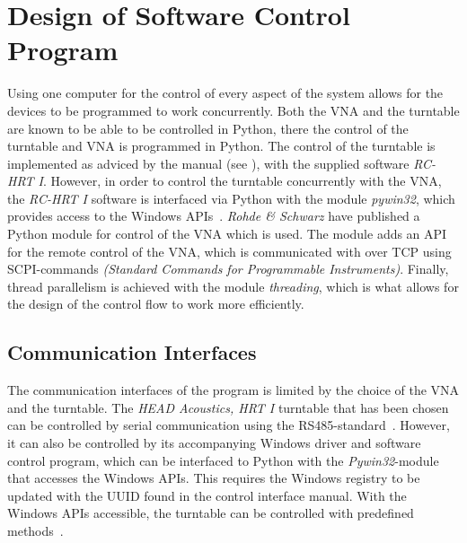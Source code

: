 \section{Design of Software Control Program}
Using one computer for the control of every aspect of the system allows for the devices to be programmed to work concurrently. Both the VNA and the turntable are known to be able to be controlled in Python, there the control of the turntable and VNA is programmed in Python. The control of the turntable is implemented as adviced by the manual (see \cite{hrt_i_manual}), with the supplied software \textit{RC-HRT I}. However, in order to control the turntable concurrently with the VNA, the \textit{RC-HRT I} software is interfaced via Python with the module \textit{pywin32}, which provides access to the Windows APIs~\cite{pywin32}. \textit{Rohde \& Schwarz} have published a Python module for control of the VNA which is used. The module adds an API for the remote control of the VNA, which is communicated with over TCP using SCPI-commands \textit{(Standard Commands for Programmable Instruments)}. Finally, thread parallelism is achieved with the module \textit{threading}, which is what allows for the design of the control flow to work more efficiently.



\subsection{Communication Interfaces}
The communication interfaces of the program is limited by the choice of the VNA and the turntable. The \textit{HEAD Acoustics, HRT I} turntable that has been chosen can be controlled by serial communication using the RS485-standard~\cite{hrt_i_data_sheet}. However, it can also be controlled by its accompanying Windows driver and software control program, which can be interfaced to Python with the \textit{Pywin32}-module that accesses the Windows APIs. This requires the Windows registry to be updated with the UUID found in the control interface manual. With the Windows APIs accessible, the turntable can be controlled with predefined methods~\cite{hrt_control_api_manual}. 

